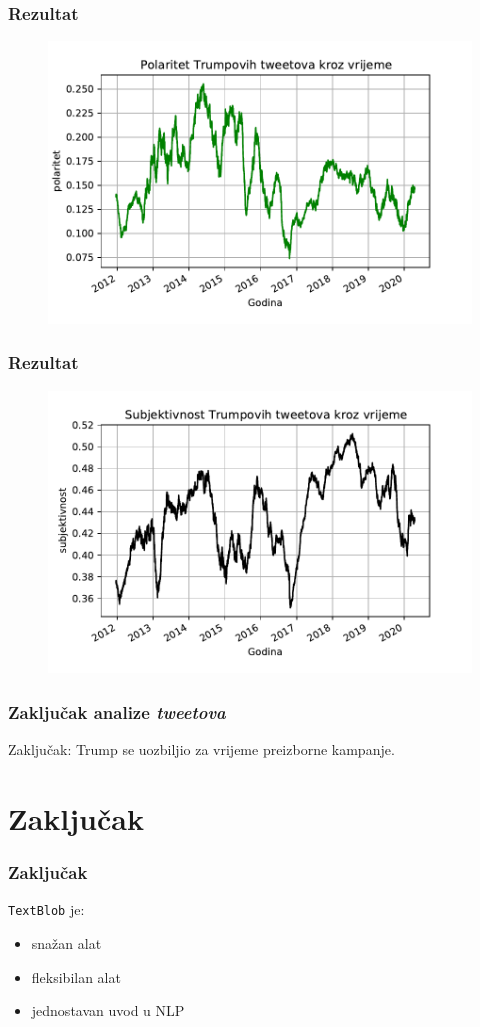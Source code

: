 \documentclass[10pt, aspectratio=169]{beamer}
\begin{document}
\begin{frame}[fragile]
	\frametitle{Rezultat}
	\begin{figure}
		\includegraphics[scale=0.9]{../rad/slike/polaritet.pdf}
	\end{figure}
\end{frame}

\begin{frame}[fragile]
	\frametitle{Rezultat}
	\begin{figure}
		\includegraphics[scale=0.9]{../rad/slike/subjektivnost.pdf}
	\end{figure}
\end{frame}


\begin{frame}[fragile]
	\frametitle{Zaključak analize \textit{tweetova}}
	Zaključak: Trump se uozbiljio za vrijeme preizborne kampanje.
\end{frame}


\section{Zaključak}
\begin{frame}[fragile]
	\frametitle{Zaključak}
	\texttt{TextBlob} je:
	\begin{itemize}
		\item snažan alat
		\item fleksibilan alat
		\item jednostavan uvod u NLP
	\end{itemize}



\end{frame}
\end{document}
